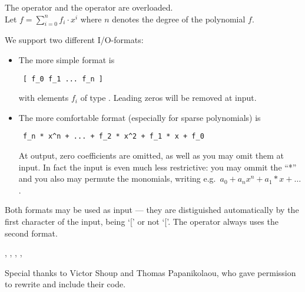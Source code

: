 The  operator \code{>>} and the  operator \code{<<}
are overloaded.\\
Let $f = \sum_{i=0}^{n} f_{i} \cdot x^{i}$ where $n$ denotes the degree of the polynomial $f$.

We support two different I/O-formats:
\begin{itemize}
\item The more simple format is
\begin{verbatim}
 [ f_0 f_1 ... f_n ]
\end{verbatim}

  with elements $f_i$ of type .  Leading zeros will be removed at input.

\item The more comfortable format (especially for sparse polynomials) is

\begin{verbatim} f_n * x^n + ... + f_2 * x^2 + f_1 * x + f_0 \end{verbatim}
At output, zero coefficients are omitted, as well as you may omit them at input.  In fact the
input is even much less restrictive: you may ommit the ``*'' and you also may permute the
monomials, writing e.g.~$a_0 + a_n x^n + a_1*x +\dots$.
\end{itemize}

Both formats may be used as input --- they are distiguished automatically by the first character
of the input, being `[' or not `['.  The  operator \code{<<} always uses the
second format.



\SEEALSO

,
,
,
,



\NOTES

Special thanks to Victor Shoup and Thomas Papanikolaou, who gave permission to rewrite and
include their code.



